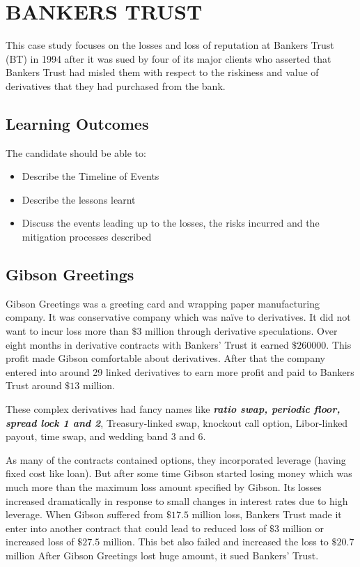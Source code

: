 \documentclass[PRMIA4A.tex]{subfiles}
\begin{document}
 

\newpage
\section{BANKERS TRUST}

This case study focuses on the losses and loss of reputation at Bankers Trust (BT) in 1994 after it was sued by four of its major clients who asserted that Bankers Trust had misled them with respect to the riskiness and value of derivatives that they had purchased from the bank.

\subsection{Learning Outcomes}
The candidate should be able to:
\begin{itemize}
	\item Describe the Timeline of Events
	\item Describe the lessons learnt
	\item Discuss the events leading up to the losses, the risks incurred
	and the mitigation processes described
\end{itemize}
\subsection{Gibson Greetings }

Gibson Greetings was a greeting card and wrapping paper manufacturing company. It was conservative company which was naïve to derivatives. It did not want to incur loss more than $\$3$ million through derivative speculations. Over eight months in derivative contracts with Bankers’ Trust it earned $\$ 260000$. This profit made Gibson comfortable about derivatives. After that the company entered into around 29 linked derivatives to earn more profit and paid to Bankers Trust  around $\$13$ million. 

These complex derivatives had fancy names like \textbf{\textit{ratio swap, periodic floor,  spread lock 1 and 2}}, Treasury-linked swap, knockout call option, Libor-linked payout, time swap, and wedding band 3 and 6. 


As many of the contracts contained options, they incorporated  leverage (having fixed cost like loan). But after some time Gibson started losing money which  was much more than the maximum loss amount specified by Gibson. Its losses increased dramatically in response to small changes in interest rates due to high leverage. When Gibson suffered from $\$17.5$ million loss, Bankers Trust made it enter into another contract that could  lead to reduced loss of $\$3$ million or increased loss of $\$27.5$ million. This bet also failed and increased the loss to $\$20.7$ million After Gibson Greetings lost huge amount, it sued Bankers’ Trust.
\end{document}
